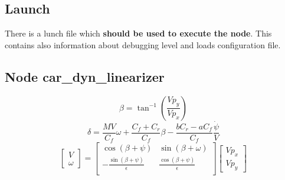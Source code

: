 \subsection{Launch}

There is a lunch file which \textbf{should be used to execute the node}. This contains also information about debugging level and loads configuration file.

\subsection{Node car\_dyn\_linearizer}

\[
\beta = \tan^{-1}\left(\frac{Vp_y}{Vp_x}\right)
\]
\[
\delta = \frac{MV}{C_f}\omega + \frac{C_f + C_r}{C_f}\beta - \frac{bC_r - aC_f}{C_f}\frac{\dot{\psi}}{V}
\]
\[
\begin{bmatrix}
	V \\
	\omega
\end{bmatrix}
=
\begin{bmatrix}
	\cos(\beta + \psi) & \sin(\beta + \omega) \\
	-\frac{\sin(\beta + \psi)}{\epsilon} & \frac{\cos(\beta + \psi)}{\epsilon} \\
\end{bmatrix}
\begin{bmatrix}
	Vp_x \\
	Vp_y
\end{bmatrix}
\]